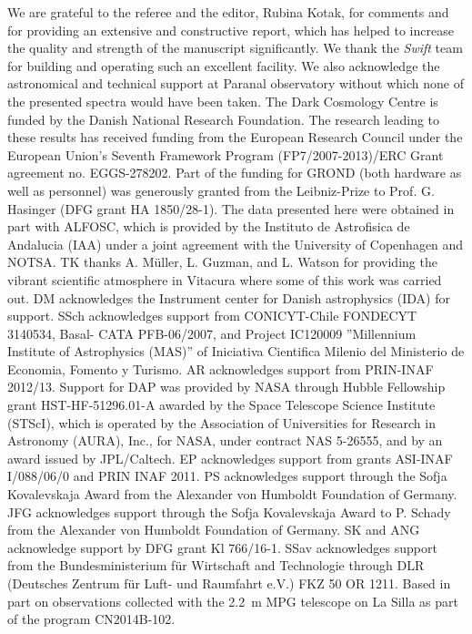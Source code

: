 \documentclass[traditabstract, longauth]{aa}
\begin{document}
\begin{acknowledgements}
We are grateful to the referee and the editor, Rubina Kotak, for comments and for providing an extensive and constructive report, which has helped to increase the quality and strength of the manuscript significantly. We thank the \textit{Swift} team for building and operating such an excellent facility. We also acknowledge the astronomical and technical support at Paranal observatory without which none of the presented spectra would have been taken. The Dark Cosmology Centre is funded by the Danish National Research Foundation. The research leading to these results has received funding from the European Research Council under the European Union's Seventh Framework Program (FP7/2007-2013)/ERC Grant agreement no. EGGS-278202. Part of the funding for GROND (both hardware as well as personnel) was generously granted from the Leibniz-Prize to Prof. G. Hasinger (DFG grant HA 1850/28-1). The data presented here were obtained in part with ALFOSC, which is provided by the Instituto de Astrofisica de Andalucia (IAA) under a joint agreement with the University of Copenhagen and NOTSA. TK thanks A. M\"{u}ller, L. Guzman, and L. Watson for providing the vibrant scientific atmosphere in Vitacura where some of this work was carried out. DM acknowledges the Instrument center for Danish astrophysics (IDA) for support. SSch acknowledges support from CONICYT-Chile FONDECYT 3140534, Basal- CATA PFB-06/2007, and Project IC120009 ''Millennium Institute of Astrophysics (MAS)'' of Iniciativa Cientifica Milenio del Ministerio de Economia, Fomento y Turismo. AR acknowledges support from PRIN-INAF 2012/13. Support for DAP was provided by NASA through Hubble Fellowship grant HST-HF-51296.01-A awarded by the Space Telescope Science Institute (STScI), which is operated by the Association of Universities  for Research in Astronomy (AURA), Inc., for NASA, under contract NAS 5-26555, and by an award issued by JPL/Caltech. EP acknowledges support from grants ASI-INAF I/088/06/0 and PRIN INAF 2011. PS acknowledges support through the Sofja Kovalevskaja Award from the Alexander von Humboldt Foundation of Germany. JFG acknowledges support through the Sofja Kovalevskaja Award to P. Schady from the Alexander von Humboldt Foundation of Germany. SK and ANG acknowledge support by DFG grant Kl 766/16-1. SSav acknowledges support from the Bundesministerium f\"ur Wirtschaft and Technologie through DLR (Deutsches Zentrum f\"ur Luft- und Raumfahrt e.V.) FKZ 50 OR 1211. Based in part on observations collected with the 2.2~m MPG telescope on La Silla  as part of the program CN2014B-102.
\end{acknowledgements}
\end{document}
